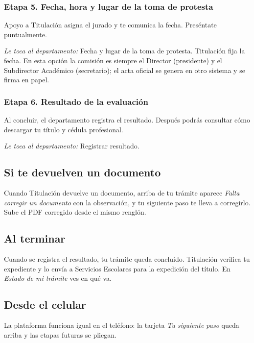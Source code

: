 \subsubsection*{Etapa 5. Fecha, hora y lugar de la toma de protesta}
Apoyo a Titulación asigna el jurado y te comunica la fecha. Preséntate puntualmente.

\emph{Le toca al departamento:} Fecha y lugar de la toma de protesta. Titulación fija la fecha. En esta opción la comisión es siempre el Director (presidente) y el Subdirector Académico (secretario); el acta oficial se genera en otro sistema y se firma en papel.
\subsubsection*{Etapa 6. Resultado de la evaluación}
Al concluir, el departamento registra el resultado. Después podrás consultar cómo descargar tu título y cédula profesional.

\emph{Le toca al departamento:} Registrar resultado. 
\subsection{Si te devuelven un documento}
Cuando Titulación devuelve un documento, arriba de tu trámite aparece \emph{Falta corregir un documento} con la observación, y tu siguiente paso te lleva a corregirlo. Sube el PDF corregido desde el mismo renglón.
\subsection{Al terminar}
Cuando se registra el resultado, tu trámite queda concluido. Titulación verifica tu expediente y lo envía a Servicios Escolares para la expedición del título. En \emph{Estado de mi trámite} ves en qué va.
\subsection{Desde el celular}
La plataforma funciona igual en el teléfono: la tarjeta \emph{Tu siguiente paso} queda arriba y las etapas futuras se pliegan.
